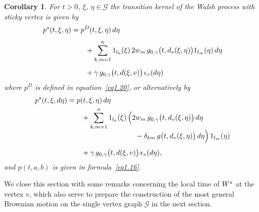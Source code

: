 \documentclass[11pt,a4paper]{amsart}
\newcommand{\gd}{\delta}
\renewcommand{\gg}{\gamma}
\newcommand{\cG}{\mathcal{G}}
\newcommand{\1}{1}
\newtheorem{corollary}[theorem]{Corollary}
\theoremstyle{remark}
\newcommand{\onel}[1][k]{\ensuremath1_{l_{#1}}}
\newcommand{\Ws}{\ensuremath W^s}
\newcommand{\psW}{\ensuremath p^s}
\numberwithin{equation}{section}
\begin{document}
\begin{corollary}   \label{cor4.8}
For $t>0$, $\xi$, $\eta\in\cG$ the transition kernel of the Walsh process with sticky
vertex is given by
\begin{equation}    \label{eq4.17}
\begin{split}
    \psW(t,\xi,\eta) &= p^D(t,\xi,\eta)\,d\eta\\[1ex]
                &\qquad + \sum_{k,m=1}^n \onel(\xi)\,2w_m
                    \,g_{0,\gg}\bigl(t,d_v(\xi,\eta)\bigr)\onel[m](\eta)\,d\eta\\[1ex]
                &\qquad + \gg\,g_{0,\gg}\bigl(t, d(\xi,v)\bigr)\,\epsilon_v(d\eta)
\end{split}
\end{equation}
where $p^D$ is defined in equation~\eqref{eq1.20}, or alternatively by
\begin{equation}    \label{eq4.18}
\begin{split}
    \psW(t,\xi,d\eta)
        &= p(t,\xi,\eta)\,d\eta\\
        &\qquad +\sum_{k,m=1}^n \onel(\xi)\,\Bigl(
                        2w_m\,g_{0,\gg}\bigl(t,d_v(\xi,\eta)\bigr)\,d\eta\\[-1ex]
        &\hspace{9.5em}   -\gd_{km}\,g\bigl(t,d_v(\xi,\eta)\bigr)\,d\eta\Bigr)\, \onel[m](\eta)\\[1ex]
        &\qquad   +\gg\,g_{0,\gg}\bigl(t, d(\xi,v)\bigr)\,\epsilon_v(d\eta),
\end{split}
\end{equation}
and $p(t,a,b)$ is given in formula~\eqref{eq1.16}.
\end{corollary}

We close this section with some remarks concerning the local time of $\Ws$ at the
vertex $v$, which also serve to prepare the construction of the most general
Brownian motion on the single vertex graph $\cG$ in the next section.
\end{document}
